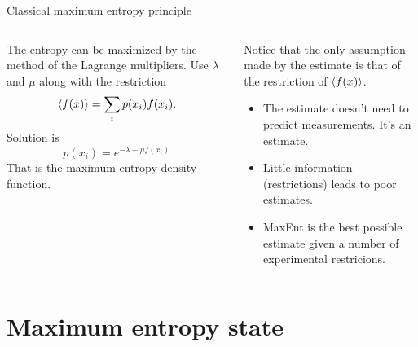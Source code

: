 \documentclass{cubeamer}
\begin{document}
\begin{frame}{Classical maximum entropy principle}
    \begin{columns}
        \begin{column}{0.5\textwidth}
            The entropy can be maximized by the method of the Lagrange multipliers. Use $\lambda$ and $\mu$
            along with the restriction
            \begin{equation*}
                \expval{f(x)}=\sum_{i}p(x_{i})f(x_{i}).
            \end{equation*}
            Solution is
            \begin{equation*}
                p(x_{i})=e^{-\lambda-\mu f(x_{i})}
            \end{equation*}
            That is the maximum entropy density function.
        \end{column}
        \begin{column}{0.5\textwidth}
            Notice that the only assumption made by the estimate is that of the restriction of $\expval{f(x)}$.
            \begin{itemize}
                \item The estimate doesn't need to predict measurements. It's an estimate.
                \item Little information (restrictions) leads to poor estimates.
                \item MaxEnt is the best possible estimate given a number of experimental restricions.
            \end{itemize}
        \end{column}
    \end{columns}
\end{frame}


\section{Maximum entropy state}
\end{document}

